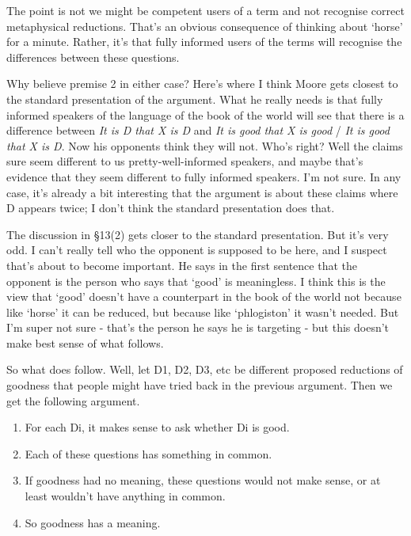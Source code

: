 \documentclass[
]{article}
\providecommand{\tightlist}{%
  \setlength{\itemsep}{0pt}\setlength{\parskip}{0pt}}
\begin{document}
The point is not we might be competent users of a term and not recognise
correct metaphysical reductions. That's an obvious consequence of
thinking about `horse' for a minute. Rather, it's that fully informed
users of the terms will recognise the differences between these
questions.

Why believe premise 2 in either case? Here's where I think Moore gets
closest to the standard presentation of the argument. What he really
needs is that fully informed speakers of the language of the book of the
world will see that there is a difference between \emph{It is D that X
is D} and \emph{It is good that X is good} / \emph{It is good that X is
D}. Now his opponents think they will not. Who's right? Well the claims
sure seem different to us pretty-well-informed speakers, and maybe
that's evidence that they seem different to fully informed speakers. I'm
not sure. In any case, it's already a bit interesting that the argument
is about these claims where D appears twice; I don't think the standard
presentation does that.

The discussion in §13(2) gets closer to the standard presentation. But
it's very odd. I can't really tell who the opponent is supposed to be
here, and I suspect that's about to become important. He says in the
first sentence that the opponent is the person who says that `good' is
meaningless. I think this is the view that `good' doesn't have a
counterpart in the book of the world not because like `horse' it can be
reduced, but because like `phlogiston' it wasn't needed. But I'm super
not sure - that's the person he says he is targeting - but this doesn't
make best sense of what follows.

So what does follow. Well, let D1, D2, D3, etc be different proposed
reductions of goodness that people might have tried back in the previous
argument. Then we get the following argument.

\begin{enumerate}
\def\labelenumi{\arabic{enumi}.}
\tightlist
\item
  For each Di, it makes sense to ask whether Di is good.
\item
  Each of these questions has something in common.
\item
  If goodness had no meaning, these questions would not make sense, or
  at least wouldn't have anything in common.
\item
  So goodness has a meaning.
\end{enumerate}
\end{document}
